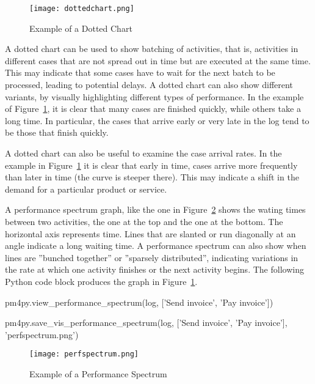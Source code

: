\begin{figure}
\centering
\texttt{[image: dottedchart.png]}
\caption{Example of a Dotted Chart}
\label{fig:dotted_chart}
\end{figure}

A dotted chart can be used to show batching of activities, that is, activities in different cases that are not spread out in time but are executed at the same time. This may indicate that some cases have to wait for the next batch to be processed, leading to potential delays. A dotted chart can also show different variants, by visually highlighting different types of performance. In the example of Figure~\ref{fig:dotted_chart}, it is clear that many cases are finished quickly, while others take a long time. In particular, the cases that arrive early or very late in the log tend to be those that finish quickly. 

A dotted chart can also be useful to examine the case arrival rates. In the example in Figure~\ref{fig:dotted_chart} it is clear that early in time, cases arrive more frequently than later in time (the curve is steeper there). This may indicate a shift in the demand for a particular product or service. 

A performance spectrum graph, like the one in Figure~\ref{fig:perf_spectrum} shows the wating times between two activities, the one at the top and the one at the bottom. The horizontal axis represents time. Lines that are slanted or run diagonally at an angle indicate a long waiting time. A performance spectrum can also show when lines are ''bunched together'' or ''sparsely distributed'', indicating variations in the rate at which one activity finishes or the next activity begins. The following Python code block produces the graph in Figure~\ref{fig:dotted_chart}.

\begin{samepage}
\begin{pythoncode}
pm4py.view_performance_spectrum(log,
    ['Send invoice', 'Pay invoice'])

pm4py.save_vis_performance_spectrum(log,
    ['Send invoice', 'Pay invoice'],
    'perfspectrum.png') 
\end{pythoncode}
\end{samepage}

\begin{figure}
\centering
\texttt{[image: perfspectrum.png]}
\caption{Example of a Performance Spectrum}
\label{fig:perf_spectrum}
\end{figure}

